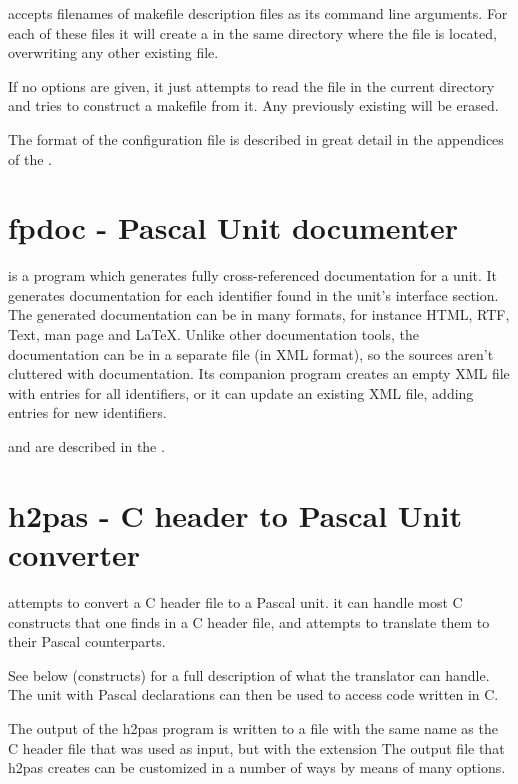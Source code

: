  accepts filenames of makefile description files as its
command line arguments. For each of these files it will create a
 in the same directory where the file is located,
overwriting any other existing file.

If no options are given, it just attempts to read the file 
in the current directory and tries to construct a makefile from it.
Any previously existing  will be erased.

The format of the  configuration file is described in great
detail in the appendices of the \progref.

\section{fpdoc - Pascal Unit documenter}

 is a program which generates fully cross-referenced
documentation for a unit. It generates documentation for each 
identifier found in the unit's interface section. The generated 
documentation can be in many formats, for instance HTML, RTF, Text, man
page and LaTeX. 
Unlike other documentation tools, the documentation can be in a separate
file (in XML format), so the sources aren't cluttered with documentation.
Its companion program  creates an empty XML file with
entries for all identifiers, or it can update an existing XML file, 
adding entries for new identifiers.

 and  are described in the \fpdocref.

\section{h2pas - C header to Pascal Unit converter}
 attempts to convert a C header file to a Pascal unit. 
it can handle most C constructs that one finds in a C header file,
and attempts to translate them to their Pascal counterparts. 

See below (constructs) for a full description of what the translator can handle.
The unit with Pascal declarations can then be used to access code written in C.

The output of the h2pas program is written to a file with the same name as
the C header file that was used as input, but with the extension 
The output file that h2pas creates can be customized in a number of ways by
means of many options.

